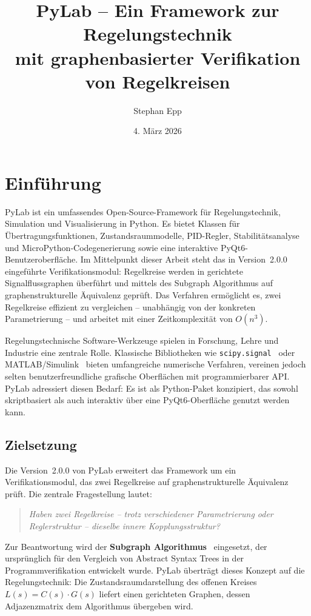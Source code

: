 \documentclass[a4paper,12pt]{article}
\title{PyLab -- Ein Framework zur Regelungstechnik\\
       mit graphenbasierter Verifikation von Regelkreisen}
\author{Stephan Epp}
\date{4. März 2026}
\theoremstyle{definition}
\begin{document}
\maketitle

\tableofcontents
\newpage

\section{Einführung}
PyLab ist ein umfassendes Open-Source-Framework für Regelungstechnik, Simulation
und Visualisierung in Python. Es bietet Klassen für Übertragungsfunktionen,
Zustandsraummodelle, PID-Regler, Stabilitätsanalyse und MicroPython-Codegenerierung
sowie eine interaktive PyQt6-Benutzeroberfläche. Im Mittelpunkt dieser Arbeit steht
das in Version~2.0.0 eingeführte Verifikationsmodul: Regelkreise werden in
gerichtete Signalflussgraphen überführt und mittels des Subgraph Algorithmus
auf graphenstrukturelle Äquivalenz geprüft. Das Verfahren ermöglicht es, zwei
Regelkreise effizient zu vergleichen -- unabhängig von der konkreten
Parametrierung -- und arbeitet mit einer Zeitkomplexität von $O(n^3)$.

Regelungstechnische Software-Werkzeuge spielen in Forschung, Lehre und Industrie
eine zentrale Rolle. Klassische Bibliotheken wie \texttt{scipy.signal}~\cite{scipy} oder
MATLAB/Si\-mulink~\cite{matlab} bieten umfangreiche numerische Verfahren, vereinen jedoch
selten benutzerfreundliche grafische Oberflächen mit programmierbarer API.
PyLab adressiert diesen Bedarf: Es ist als Python-Paket konzipiert, das sowohl
skriptbasiert als auch interaktiv über eine PyQt6-Oberfläche genutzt werden kann.

\subsection{Zielsetzung}

Die Version~2.0.0 von PyLab erweitert das Framework um ein Verifikationsmodul,
das zwei Regelkreise auf graphenstrukturelle Äquivalenz prüft. Die zentrale
Fragestellung lautet:

\begin{quote}
\textit{Haben zwei Regelkreise -- trotz verschiedener Parametrierung oder
Reglerstruktur -- dieselbe innere Kopplungsstruktur?}
\end{quote}

Zur Beantwortung wird der \textbf{Subgraph Algorithmus}~\cite{subgraph} eingesetzt,
der ursprünglich für den Vergleich von Abstract Syntax Trees in der
Programmverifikation entwickelt wurde. PyLab überträgt dieses Konzept auf die
Regelungstechnik: Die Zustandsraumdarstellung des offenen Kreises $L(s) = C(s) \cdot G(s)$
liefert einen gerichteten Graphen, dessen Adjazenzmatrix dem Algorithmus übergeben wird.
\end{document}
